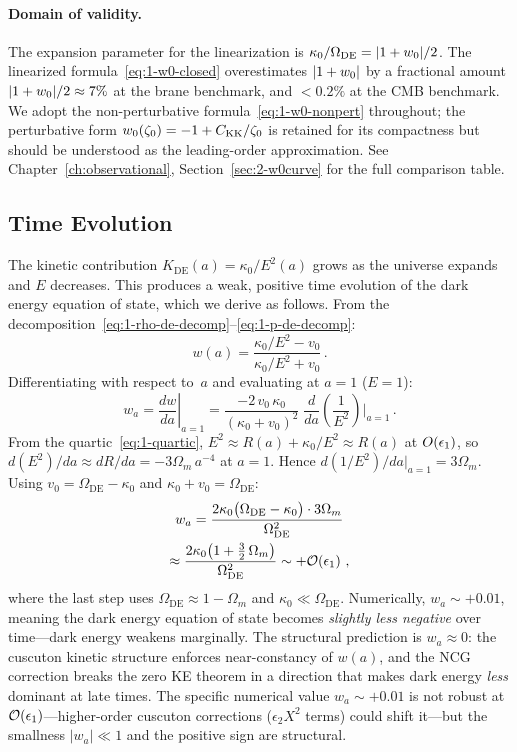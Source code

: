 \paragraph{Domain of validity.} The expansion parameter for the linearization is $\kappa_0/\Omega_{\mathrm{DE}} = |1+w_0|/2$. The linearized formula~\eqref{eq:1-w0-closed} overestimates $|1+w_0|$ by a fractional amount $|1+w_0|/2 \approx 7\%$ at the brane benchmark, and $< 0.2\%$ at the CMB benchmark. We adopt the non-perturbative formula~\eqref{eq:1-w0-nonpert} throughout; the perturbative form $w_0(\zeta_0) = -1 + C_{\mathrm{KK}}/\zeta_0$ is retained for its compactness but should be understood as the leading-order approximation. See Chapter~\ref{ch:observational}, Section~\ref{sec:2-w0curve} for the full comparison table.

\subsection{Time Evolution}
\label{sec:1-time-evolution}

The kinetic contribution $K_{\mathrm{DE}}(a) = \kappa_0/E^2(a)$ grows as the universe expands and $E$ decreases. This produces a weak, positive time evolution of the dark energy equation of state, which we derive as follows. From the decomposition~\eqref{eq:1-rho-de-decomp}--\eqref{eq:1-p-de-decomp}:
\begin{equation}
w(a) = \frac{\kappa_0/E^2 - v_0}{\kappa_0/E^2 + v_0}\,.
\end{equation}
Differentiating with respect to~$a$ and evaluating at $a = 1$ ($E = 1$):
\begin{equation}
w_a = \left.\frac{dw}{da}\right|_{a=1} = \frac{-2\,v_0\,\kappa_0}{(\kappa_0 + v_0)^2}\;\frac{d}{da}\!\left(\frac{1}{E^2}\right)\bigg|_{a=1}\,.
\end{equation}
From the quartic~\eqref{eq:1-quartic}, $E^2 \approx R(a) + \kappa_0/E^2 \approx R(a)$ at $O(\epsilon_1)$, so $d(E^2)/da \approx dR/da = -3\Omega_m\,a^{-4}$ at $a=1$. Hence $d(1/E^2)/da|_{a=1} = 3\Omega_m$. Using $v_0 = \Omega_\mathrm{DE} - \kappa_0$ and $\kappa_0 + v_0 = \Omega_\mathrm{DE}$:
\begin{multline}
\label{eq:1-wa}
w_a = \frac{2\kappa_0\bigl(\Omega_\mathrm{DE} - \kappa_0\bigr)\cdot 3\Omega_m}{\Omega_{\mathrm{DE}}^2} \\
    \approx \frac{2\kappa_0\bigl(1 + \tfrac{3}{2}\,\Omega_m\bigr)}{\Omega_{\mathrm{DE}}^2} \sim +\mathcal{O}\!\left(\epsilon_1\right)\,,
\end{multline}
where the last step uses $\Omega_\mathrm{DE} \approx 1 - \Omega_m$ and $\kappa_0 \ll \Omega_\mathrm{DE}$.
Numerically, $w_a \sim +0.01$, meaning the dark energy equation of state becomes \emph{slightly less negative} over time---dark energy weakens marginally. The structural prediction is $w_a \approx 0$: the cuscuton kinetic structure enforces near-constancy of $w(a)$, and the NCG correction breaks the zero KE theorem in a direction that makes dark energy \emph{less} dominant at late times. The specific numerical value $w_a \sim +0.01$ is not robust at $\mathcal{O}\!\left(\epsilon_1\right)$---higher-order cuscuton corrections ($\epsilon_2 X^2$ terms) could shift it---but the smallness $|w_a| \ll 1$ and the positive sign are structural.

